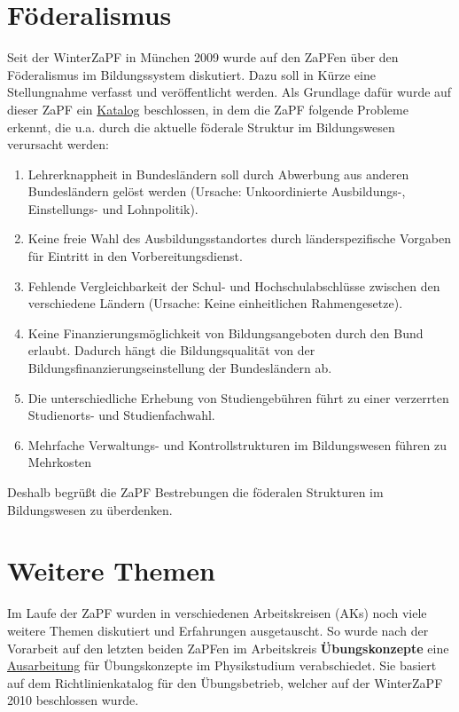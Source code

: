 \documentclass{scrartcl}
\begin{document}
\section*{Föderalismus}
\vspace{-12pt}
Seit der WinterZaPF in München 2009 wurde auf den ZaPFen über den Föderalismus im Bildungssystem
diskutiert. Dazu soll
in Kürze eine Stellungnahme verfasst und veröffentlicht werden. Als Grundlage dafür wurde auf dieser ZaPF ein
\href{http://www.zapfev.de/resolutionen/sose11/Reso_Foederalismus.pdf}{Katalog} beschlossen, in dem die
ZaPF folgende Probleme erkennt, die u.a.
durch die aktuelle föderale Struktur im Bildungswesen verursacht werden:
\begin{enumerate}
 \item Lehrerknappheit in Bundesländern soll durch Abwerbung aus anderen Bundesländern gelöst werden (Ursache:
Unkoordinierte Ausbildungs-, Einstellungs- und Lohnpolitik).
 \item Keine freie Wahl des Ausbildungsstandortes durch länderspezifische Vorgaben für Eintritt in den
Vorbereitungsdienst.
 \item Fehlende Vergleichbarkeit der Schul- und Hochschulabschlüsse zwischen den verschiedene Ländern (Ursache: Keine
einheitlichen Rahmengesetze).
 \item Keine Finanzierungsmöglichkeit von Bildungsangeboten durch den Bund erlaubt. Dadurch hängt die Bildungsqualität
von der Bildungsfinanzierungseinstellung der Bundesländern ab.
 \item Die unterschiedliche Erhebung von Studiengebühren führt zu einer verzerrten Studien\-orts- und Studienfachwahl.
 \item Mehrfache Verwaltungs- und Kontrollstrukturen im Bildungswesen führen zu Mehrkosten
\end{enumerate}
Deshalb begrüßt die ZaPF Bestrebungen die föderalen Strukturen im Bildungswesen zu überdenken.

\section*{Weitere Themen}
\vspace{-12pt}
Im Laufe der ZaPF wurden in verschiedenen Arbeitskreisen (AKs) noch viele weitere Themen diskutiert und Erfahrungen
ausgetauscht. So wurde nach der Vorarbeit auf den letzten beiden ZaPFen im Arbeitskreis \textbf{Übungskonzepte}
eine \href{http://www.zapfev.de/resolutionen/sose11/Reso_Uebungskonzepte.pdf}{Ausarbeitung} für
Übungskonzepte im Physikstudium verabschiedet.
Sie basiert auf dem Richtlinienkatalog für den Übungsbetrieb, welcher auf der WinterZaPF 2010 beschlossen wurde.
\end{document}

